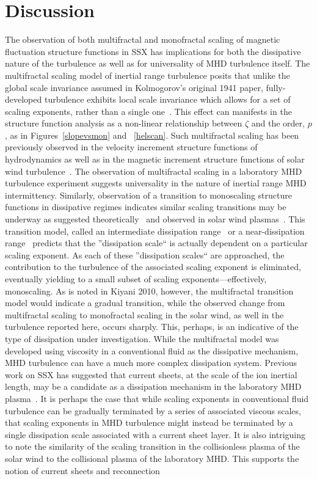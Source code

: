 \documentclass[aps,prl,amsmath,amssymb,reprint,superscriptaddress]{revtex4-1} %
\begin{document}
\section{Discussion}

The observation of both multifractal and monofractal scaling of magnetic fluctuation structure functions in SSX has implications for both the dissipative nature of the turbulence as well as for universality of MHD turbulence itself. The multifractal scaling model of inertial range turbulence posits that unlike the global scale invariance assumed in Kolmogorov's original 1941 paper, fully-developed turbulence exhibits local scale invariance which allows for a set of scaling exponents, rather than a single one~\cite{benzi1984,frisch1991}. This effect can manifests in the structure function analysis as a non-linear relationship between $\zeta$ and the order, $p$, as in Figures~\ref{slopevsmon} and ~\ref{helscan}. Such multifractal scaling has been previously observed in the velocity increment structure functions of hydrodynamics as well as in the magnetic increment structure functions of solar wind turbulence~\cite{tu1995}. The observation of multifractal scaling in a laboratory MHD turbulence experiment suggests universality in the nature of inertial range MHD intermittency. Similarly, observation of a transition to monoscaling structure functions in dissipative regimes indicates similar scaling transitions may be underway as suggested theoretically~\cite{frisch1991,chevillard2005} and observed in solar wind plasmas~\cite{kiyani2009,kiyani2010,kiyani2013}. This transition model, called an intermediate dissipation range~\cite{frisch1991} or a near-dissipation range~\cite{chevillard2005} predicts that the ''dissipation scale`` is actually dependent on a particular scaling exponent. As each of these ''dissipation scales`` are approached, the contribution to the turbulence of the associated scaling exponent is eliminated, eventually yielding to a small subset of scaling exponents---effectively, monoscaling.  As is noted in Kiyani 2010, however, the multifractal transition model would indicate a gradual transition, while the observed change from multifractal scaling to monofractal scaling in the solar wind, as well in the turbulence reported here, occurs sharply. This, perhaps, is an indicative of the type of dissipation under investigation. While the multifractal model was developed using viscosity in a conventional fluid as the dissipative mechanism, MHD turbulence can have a much more complex dissipation system. Previous work on SSX has suggested that current sheets, at the scale of the ion inertial length, may be a candidate as a dissipation mechanism in the laboratory MHD plasma~\cite{schaffner2014c}. It is perhaps the case that while scaling exponents in conventional fluid turbulence can be gradually terminated by a series of associated viscous scales, that scaling exponents in MHD turbulence might instead be terminated by a single dissipation scale associated with a current sheet layer. It is also intriguing to note the similarity of the scaling transition in the collisionless plasma of the solar wind to the collisional plasma of the laboratory MHD. This supports the notion of current sheets and reconnection 
\end{document}
